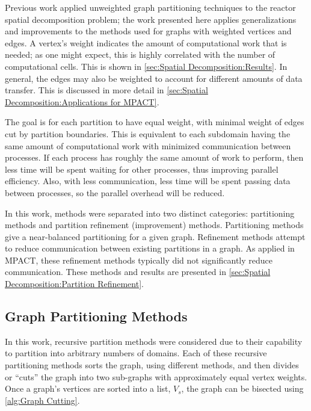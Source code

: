 {{    Previous work \cite{Fitzgerald2017} applied unweighted graph partitioning techniques to the reactor spatial decomposition problem; the work presented here applies generalizations and improvements to the methods used for graphs with weighted vertices and edges.
    A vertex's weight indicates the amount of computational work that is needed; as one might expect, this is highly correlated with the number of computational cells.
    This is shown in \cref{sec:Spatial Decomposition:Results}.
    In general, the edges may also be weighted to account for different amounts of data transfer.
    This is discussed in more detail in \cref{sec:Spatial Decomposition:Applications for MPACT}.

    The goal is for each partition to have equal weight, with minimal weight of edges cut by partition boundaries.
    This is equivalent to each subdomain having the same amount of computational work with minimized communication between processes.
    If each process has roughly the same amount of work to perform, then less time will be spent waiting for other processes, thus improving parallel efficiency.
    Also, with less communication, less time will be spent passing data between processes, so the parallel overhead will be reduced.

    In this work, methods were separated into two distinct categories: partitioning methods and partition refinement (improvement) methods.
    Partitioning methods give a near-balanced partitioning for a given graph.
    Refinement methods attempt to reduce communication between existing partitions in a graph.
    As applied in MPACT, these refinement methods typically did not significantly reduce communication.
    These methods and results are presented in \cref{sec:Spatial Decomposition:Partition Refinement}.
    \subsection{Graph Partitioning Methods}{\label{ssec:Spatial Decomposition:Graph Partitioning Methods}
      In this work, recursive partition methods were considered due to their capability to partition into arbitrary numbers of domains.
      Each of these recursive partitioning methods sorts the graph, using different methods, and then divides or ``cuts'' the graph into two sub-graphs with approximately equal vertex weights.
      Once a graph's vertices are sorted into a list, $V_s$, the graph can be bisected using \cref{alg:Graph Cutting}.

}}}

